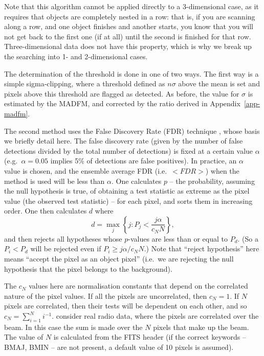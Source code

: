 \documentclass[12pt,a4paper]{article}
\newcommand{\eg}{e.g.\ }
\newcommand{\ie}{i.e.\ }
\begin{document}
Note that this algorithm cannot be applied directly to a 3-dimensional
case, as it requires that objects are completely nested in a row: that
is, if you are scanning along a row, and one object finishes and
another starts, you know that you will not get back to the first one
(if at all) until the second is finished for that
row. Three-dimensional data does not have this property, which is why
we break up the searching into 1- and 2-dimensional cases.

The determination of the threshold is done in one of two ways. The
first way is a simple sigma-clipping, where a threshold defined as
$n\sigma$ above the mean is set and pixels above this threshold are
flagged as detected. As before, the value for $\sigma$ is estimated by
the MADFM, and corrected by the ratio derived in
Appendix~\ref{app-madfm}. 

The second method uses the False Discovery Rate (FDR) technique
\citep{miller01,hopkins02}, whose basis we briefly detail here. The
false discovery rate (given by the number of false detections divided
by the total number of detections) is fixed at a certain value
$\alpha$ (\eg $\alpha=0.05$ implies 5\% of detections are false
positives). In practice, an $\alpha$ value is chosen, and the ensemble
average FDR (\ie $<FDR>$) when the method is used will be less than
$\alpha$.  One calculates $p$ -- the probability, assuming the null
hypothesis is true, of obtaining a test statistic as extreme as the
pixel value (the observed test statistic) -- for each pixel, and sorts
them in increasing order. One then calculates $d$ where
\[
d = \max_j \left\{ j : P_j < \frac{j\alpha}{c_N N} \right\},
\]
and then rejects all hypotheses whose $p$-values are less than or equal
to $P_d$. (So a $P_i<P_d$ will be rejected even if $P_i \geq
j\alpha/c_N N$.) Note that ``reject hypothesis'' here means ``accept
the pixel as an object pixel'' (\ie we are rejecting the null
hypothesis that the pixel belongs to the background). 

The $c_N$ values here are normalisation constants that depend on the
correlated nature of the pixel values. If all the pixels are
uncorrelated, then $c_N=1$. If $N$ pixels are correlated, then their
tests will be dependent on each other, and so $c_N = \sum_{i=1}^N
i^{-1}$. \citet{hopkins02} consider real radio data, where the pixels
are correlated over the beam. In this case the sum is made over the
$N$ pixels that make up the beam. The value of $N$ is calculated from
the FITS header (if the correct keywords -- BMAJ, BMIN -- are not
present, a default value of 10 pixels is assumed).
\end{document}
